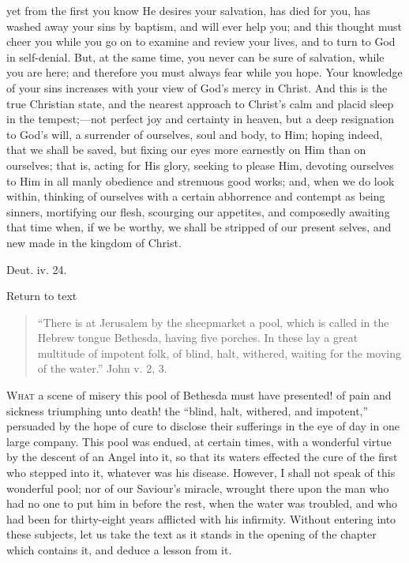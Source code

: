 yet from the first you know He desires your salvation,
has died for you, has washed away your sins by baptism,
and will ever help you; and this thought must cheer you
while you go on to examine and review your lives, and to
turn to God in self-denial. But, at the same time, you
never can be sure of salvation, while you are here; and
therefore you must always fear while you hope. Your
knowledge of your sins increases with your view of God's
mercy in Christ. And this is the true Christian state,
and the nearest approach to Christ's calm and placid
sleep in the tempest;—not perfect joy and certainty
in heaven, but a deep resignation to God's will, a
surrender of ourselves, soul and body, to Him; hoping
indeed, that we shall be saved, but fixing our eyes more
earnestly on Him than on ourselves; that is, acting for
His glory, seeking to please Him, devoting ourselves to
Him in all manly obedience and strenuous good works; and,
when we do look within, thinking of ourselves with a
certain abhorrence and contempt as being sinners,
mortifying our flesh, scourging our appetites, and
composedly awaiting that time when, if we be worthy, we
shall be stripped of our present selves, and new made in
the kingdom of Christ.


Deut. iv. 24.

Return to text


\begin{quote}

``There is at Jerusalem by the sheepmarket a
pool, which is called in the Hebrew tongue Bethesda,
having five porches. In these lay a great multitude
of impotent folk, of blind, halt, withered, waiting
for the moving of the water.'' John v. 2, 3.

\end{quote}

W\textsc{hat} a scene of misery this pool of Bethesda must have
presented! of pain and sickness triumphing unto death!
the ``blind, halt, withered, and impotent,''
persuaded by the hope of cure to disclose their
sufferings in the eye of day in one large company. This
pool was endued, at certain times, with a wonderful
virtue by the descent of an Angel into it, so that its
waters effected the cure of the first who stepped into
it, whatever was his disease. However, I shall not speak
of this wonderful pool; nor of our Saviour's miracle,
wrought there upon the man who had no one to put him in
before the rest, when the water was troubled, and who had
been for thirty-eight years afflicted with his infirmity.
Without entering into these subjects, let us take the
text as it stands in the opening of the chapter which
contains it, and deduce a lesson from it.

